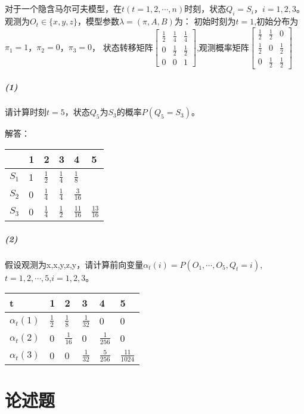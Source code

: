 \documentclass[UTF8]{ctexart}
\begin{document}
\subsection{}
\paragraph{}
对于一个隐含马尔可夫模型，在$t(t=1,2,\cdots,n)$时刻，状态$Q_i=S_i$，$i=1,2,3$。观测为$O_t\in \{x,y,z\}$，模型参数$\lambda=(\pi,A,B)$为：
初始时刻为$t=1$,初始分布为$\pi_1=1$，$\pi_2=0$，$\pi_3=0$，
状态转移矩阵$\begin{bmatrix} 
\frac{1}{2} & \frac{1}{4} & \frac{1}{4}\\
0 & \frac{1}{2} & \frac{1}{2} \\
0 & 0 & 1
\end{bmatrix}$,观测概率矩阵$\begin{bmatrix}
\frac{1}{2} & \frac{1}{2} & 0\\
\frac{1}{2} & 0 & \frac{1}{2} \\
0 & \frac{1}{2} & \frac{1}{2}
\end{bmatrix}$
\subparagraph{(1)}
请计算时刻$t=5$，状态$Q_5$为$S_3$的概率$P(Q_5=S_3)$。

解答：
\begin{tabular}{|l|l|l|l|l|l|}
\hline
\quad & 1 & 2 & 3 & 4 & 5 \\
\hline
$S_1$ & 1 & $\frac{1}{2}$ & $\frac{1}{4}$ & $\frac{1}{8}$ & \quad \\
\hline
$S_2$ & 0 & $\frac{1}{4}$ & $\frac{1}{4}$ & $\frac{3}{16}$ & \quad \\
\hline
$S_3$ & 0 & $\frac{1}{4}$ & $\frac{1}{2}$ & $\frac{11}{16}$ & $\frac{13}{16}$\\
\hline
\end{tabular}
\subparagraph{(2)}
假设观测为x,x,y,z,y，请计算前向变量$\alpha_t(i)=P(O_1,\cdots,O_5,Q_t=i)$,$t=1,2,\cdots,5$,$i=1,2,3$。
\begin{tabular}{|l|l|l|l|l|l|}
\hline
t & 1 & 2 & 3 & 4 & 5 \\
\hline
$\alpha_t(1)$ & $\frac{1}{2}$ & $\frac{1}{8}$ & $\frac{1}{32}$ & 0 & 0 \\
\hline
$\alpha_t(2)$ & 0 & $\frac{1}{16}$ & 0 & $\frac{1}{256}$ & 0\\
\hline
$\alpha_t(3)$ & 0 & 0 & $\frac{1}{32}$ & $\frac{5}{256}$ & $\frac{11}{1024}$ \\
\hline
\end{tabular}
\section{论述题}
\end{document}
